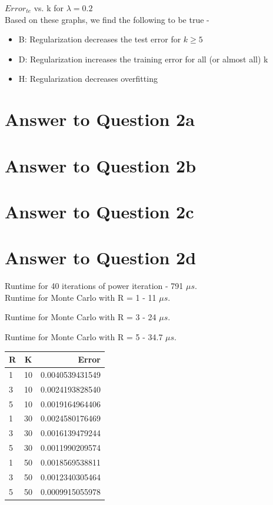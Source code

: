 \documentclass[11pt]{article}
\begin{document}
{$Error_{te}$ vs. k for $ \lambda = 0.2$\\

Based on these graphs, we find the following to be true - 
\begin{itemize}
\item B: Regularization decreases the test error for $k \geq 5$
\item D: Regularization increases the training error for all (or almost all) k
\item H: Regularization decreases overfitting
\end{itemize}


\pagebreak[4]
\section*{Answer to Question 2a}



\pagebreak[4]
\section*{Answer to Question 2b}

\pagebreak[4]
\section*{Answer to Question 2c}

\pagebreak[4]
\section*{Answer to Question 2d}
Runtime for 40 iterations of power iteration - 791 $\mu s$.\\

Runtime for Monte Carlo with R = 1 - 11 $\mu s$.\

Runtime for Monte Carlo with R = 3 - 24 $\mu s$.\

Runtime for Monte Carlo with R = 5 - 34.7 $\mu s$.\\

\begin{tabular}{l | c | r}
\hline R & K & Error \\
\hline 1 & 10 & 0.0040539431549\\
\hline 3 & 10 & 0.0024193828540\\
\hline 5 & 10 & 0.0019164964406\\
\hline 1 & 30 & 0.0024580176469\\
\hline 3 & 30 & 0.0016139479244\\
\hline 5 & 30 & 0.0011990209574\\
\hline 1 & 50 & 0.0018569538811\\
\hline 3 & 50 & 0.0012340305464\\
\hline 5 & 50 & 0.0009915055978\\
\hline
\end{tabular}


}
\end{document}

